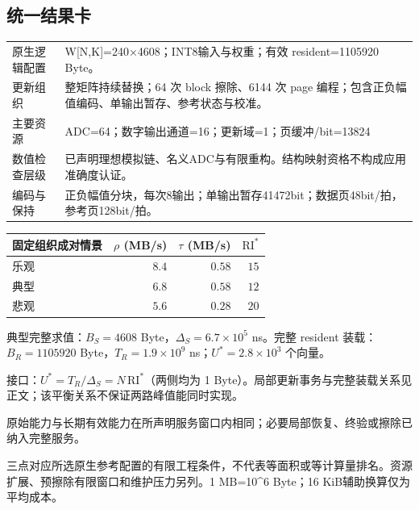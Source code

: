 \subsection*{统一结果卡}
\begingroup\small
\noindent\begin{tabularx}{\textwidth}{@{}p{24mm}X@{}}\toprule
原生逻辑配置 & W[N,K]=240×4608；INT8输入与权重；有效 resident=1105920 Byte。\\
更新组织 & 整矩阵持续替换；64 次 block 擦除、6144 次 page 编程；包含正负幅值编码、单输出暂存、参考状态与校准。\\
主要资源 & ADC=64；数字输出通道=16；更新域=1；页缓冲/bit=13824\\
数值检查层级 & 已声明理想模拟链、名义ADC与有限重构。结构映射资格不构成应用准确度认证。\\
编码与保持 & 正负幅值分块，每次8输出；单输出暂存41472bit；数据页48bit/拍，参考页128bit/拍。\\
\bottomrule\end{tabularx}
\vspace{3mm}
\begin{center}\begin{tabular}{@{}lrrr@{}}\toprule
固定组织成对情景 & $\rho$ (MB/s) & $\tau$ (MB/s) & $\mathrm{RI}^{*}$\\\midrule
乐观 & $8.4$ & $0.58$ & $15$\\
典型 & $6.8$ & $0.58$ & $12$\\
悲观 & $5.6$ & $0.28$ & $20$\\
\bottomrule\end{tabular}\end{center}
\noindent 典型完整求值：$B_S=4608$ Byte，$\Delta_S=6.7\times10^{5}$ ns。完整 resident 装载：$B_R=1105920$ Byte，$T_R=1.9\times10^{9}$ ns；$U^*=2.8\times10^{3}$ 个向量。
\par\smallskip\noindent 接口：$U^*=T_R/\Delta_S=N\,\mathrm{RI}^*$（两侧均为 1 Byte）。局部更新事务与完整装载关系见正文；该平衡关系不保证两路峰值能同时实现。
\par\smallskip\noindent 原始能力与长期有效能力在所声明服务窗口内相同；必要局部恢复、终验或擦除已纳入完整服务。
\par\smallskip\noindent 三点对应所选原生参考配置的有限工程条件，不代表等面积或等计算量排名。资源扩展、预擦除有限窗口和维护压力另列。1 MB=10\textasciicircum{}6 Byte；16 KiB辅助换算仅为平均成本。
\endgroup
\clearpage

